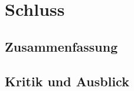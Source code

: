 \section{Schluss}
\label{sec:end:intro} 

\subsection{Zusammenfassung}
\label{sec:end:zsm}

\subsection{Kritik und Ausblick}
\label{sec:end:outro}
